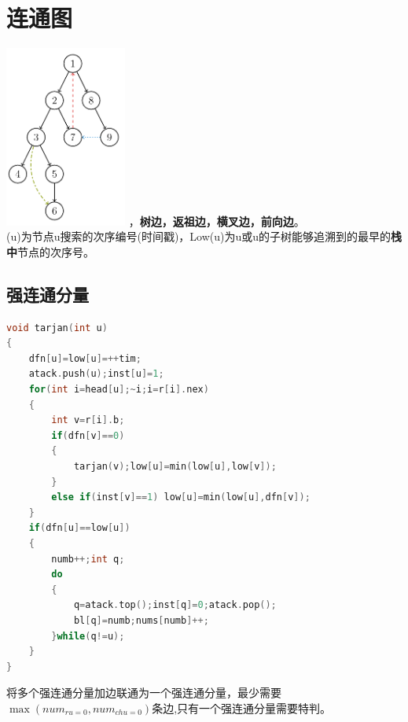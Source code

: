 \documentclass[a4paper]{book}
\begin{document}
\section{连通图}
\includegraphics[width=0.3\textwidth,center]{../photo/dfstree}
，\textbf{树边，返祖边，横叉边，前向边}。\\
(u)为节点u搜索的次序编号(时间戳)，Low(u)为u或u的子树能够追溯到的最早的\textbf{栈中}节点的次序号。
\subsection{强连通分量}
\begin{lstlisting}[language=C++]
void tarjan(int u)
{
    dfn[u]=low[u]=++tim;
    atack.push(u);inst[u]=1;
    for(int i=head[u];~i;i=r[i].nex)
    {
        int v=r[i].b;
        if(dfn[v]==0)
        {
            tarjan(v);low[u]=min(low[u],low[v]);
        }
        else if(inst[v]==1) low[u]=min(low[u],dfn[v]);
    }
    if(dfn[u]==low[u])
    {
        numb++;int q;
        do
        {
            q=atack.top();inst[q]=0;atack.pop();
            bl[q]=numb;nums[numb]++;
        }while(q!=u);
    }
}
\end{lstlisting}
将多个强连通分量加边联通为一个强连通分量，最少需要$\max (num_{ru=0},num_{chu=0})$条边,只有一个强连通分量需要特判。
\end{document}
